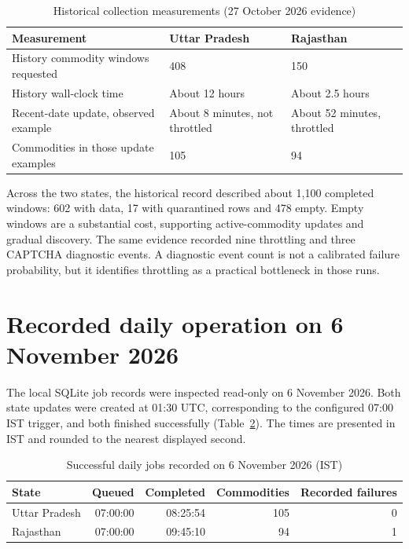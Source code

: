 \documentclass[12pt,a4paper,oneside]{report}
\numberwithin{equation}{chapter}
\numberwithin{figure}{chapter}
\numberwithin{table}{chapter}
\theoremstyle{definition}
\begin{document}
\begin{table}[H]
\centering
\caption{Historical collection measurements (27 October 2026 evidence)}
\label{tab:effort}
\small
\begin{tabular}{@{}p{}p{}p{}@{}}
\toprule
Measurement & Uttar Pradesh & Rajasthan \\
\midrule
History commodity windows requested & 408 & 150 \\
History wall-clock time & About 12 hours & About 2.5 hours \\
Recent-date update, observed example & About 8 minutes, not throttled & About 52 minutes, throttled \\
Commodities in those update examples & 105 & 94 \\
\bottomrule
\end{tabular}
\end{table}

Across the two states, the historical record described about 1,100 completed windows: 602 with data, 17 with quarantined rows and 478 empty. Empty windows are a substantial cost, supporting active-commodity updates and gradual discovery. The same evidence recorded nine throttling and three CAPTCHA diagnostic events. A diagnostic event count is not a calibrated failure probability, but it identifies throttling as a practical bottleneck in those runs.

\section{Recorded daily operation on 6 November 2026}
The local SQLite job records were inspected read-only on 6 November 2026. Both state updates were created at 01:30 UTC, corresponding to the configured 07:00 IST trigger, and both finished successfully (Table~\ref{tab:dailyactual}). The times are presented in IST and rounded to the nearest displayed second.

\begin{table}[H]
\centering
\caption{Successful daily jobs recorded on 6 November 2026 (IST)}
\label{tab:dailyactual}
\small
\begin{tabular}{@{}lrrrr@{}}
\toprule
State & Queued & Completed & Commodities & Recorded failures \\
\midrule
Uttar Pradesh & 07:00:00 & 08:25:54 & 105 & 0 \\
Rajasthan & 07:00:00 & 09:45:10 & 94 & 1 \\
\bottomrule
\end{tabular}
\end{table}
\end{document}
